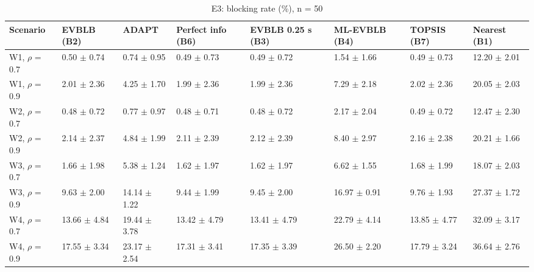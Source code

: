 \begin{table}[t]
\centering
\footnotesize
\caption{E3: blocking rate (\%), n = 50}
\label{tab:e3_blocking}
\begin{tabular}{llllllll}
\toprule
Scenario & EVBLB (B2) & ADAPT & Perfect info (B6) & EVBLB 0.25 s (B3) & ML-EVBLB (B4) & TOPSIS (B7) & Nearest (B1) \\
\midrule
W1, $\rho$ = 0.7 & 0.50 $\pm$ 0.74 & 0.74 $\pm$ 0.95 & 0.49 $\pm$ 0.73 & 0.49 $\pm$ 0.72 & 1.54 $\pm$ 1.66 & 0.49 $\pm$ 0.73 & 12.20 $\pm$ 2.01 \\
W1, $\rho$ = 0.9 & 2.01 $\pm$ 2.36 & 4.25 $\pm$ 1.70 & 1.99 $\pm$ 2.36 & 1.99 $\pm$ 2.36 & 7.29 $\pm$ 2.18 & 2.02 $\pm$ 2.36 & 20.05 $\pm$ 2.03 \\
W2, $\rho$ = 0.7 & 0.48 $\pm$ 0.72 & 0.77 $\pm$ 0.97 & 0.48 $\pm$ 0.71 & 0.48 $\pm$ 0.72 & 2.17 $\pm$ 2.04 & 0.49 $\pm$ 0.72 & 12.47 $\pm$ 2.30 \\
W2, $\rho$ = 0.9 & 2.14 $\pm$ 2.37 & 4.84 $\pm$ 1.99 & 2.11 $\pm$ 2.39 & 2.12 $\pm$ 2.39 & 8.40 $\pm$ 2.97 & 2.16 $\pm$ 2.38 & 20.21 $\pm$ 1.66 \\
W3, $\rho$ = 0.7 & 1.66 $\pm$ 1.98 & 5.38 $\pm$ 1.24 & 1.62 $\pm$ 1.97 & 1.62 $\pm$ 1.97 & 6.62 $\pm$ 1.55 & 1.68 $\pm$ 1.99 & 18.07 $\pm$ 2.03 \\
W3, $\rho$ = 0.9 & 9.63 $\pm$ 2.00 & 14.14 $\pm$ 1.22 & 9.44 $\pm$ 1.99 & 9.45 $\pm$ 2.00 & 16.97 $\pm$ 0.91 & 9.76 $\pm$ 1.93 & 27.37 $\pm$ 1.72 \\
W4, $\rho$ = 0.7 & 13.66 $\pm$ 4.84 & 19.44 $\pm$ 3.78 & 13.42 $\pm$ 4.79 & 13.41 $\pm$ 4.79 & 22.79 $\pm$ 4.14 & 13.85 $\pm$ 4.77 & 32.09 $\pm$ 3.17 \\
W4, $\rho$ = 0.9 & 17.55 $\pm$ 3.34 & 23.17 $\pm$ 2.54 & 17.31 $\pm$ 3.41 & 17.35 $\pm$ 3.39 & 26.50 $\pm$ 2.20 & 17.79 $\pm$ 3.24 & 36.64 $\pm$ 2.76 \\
\bottomrule
\end{tabular}
\end{table}
